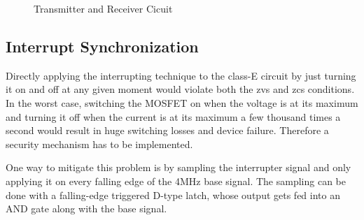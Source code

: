 \begin{figure}[h!]
    \centering
    \caption{Transmitter and Receiver Cicuit}
    \label{fig:transmitter-receiver}
\end{figure}

\newpage
\subsection{Interrupt Synchronization}

Directly applying the interrupting technique to the class-E circuit by just turning it on and off at any given moment would violate both the \gls{zvs} and \gls{zcs} conditions. In the worst case, switching the MOSFET on when the voltage is at its maximum and turning it off when the current is at its maximum a few thousand times a second would result in huge switching losses and device failure. Therefore a security mechanism has to be implemented.

One way to mitigate this problem is by sampling the interrupter signal and only applying it on every falling edge of the 4MHz base signal. The sampling can be done with a falling-edge triggered D-type latch, whose output gets fed into an AND gate along with the base signal.

\vspace{5mm}

